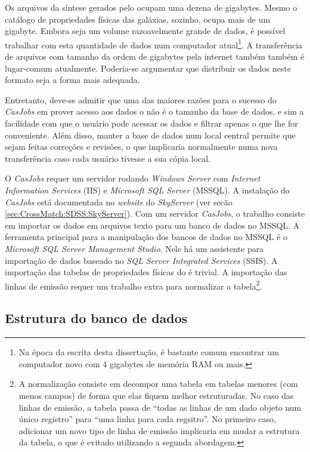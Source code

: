 Os arquivos da síntese gerados pelo \starlight ocupam uma dezena de gigabytes.
Mesmo o catálogo de propriedades físicas das galáxias, sozinho, ocupa mais de um
gigabyte. Embora seja um volume razoavelmente grande de dados, é possível
trabalhar com esta quantidade de dados num computador atual\footnote{Na época da
escrita desta dissertação, é bastante comum encontrar um computador novo com 4
gigabytes de memória RAM ou mais.}. A transferência de arquivos com tamanho da
ordem de gigabytes pela internet também também é lugar-comum atualmente.
Poderia-se argumentar que distribuir os dados neste formato seja a forma mais
adequada.

Entretanto, deve-se admitir que uma das maiores razões para o sucesso do {\em
CasJobs} em prover acesso aos dados o \SDSS não é o tamanho da base de dados, e
sim a facilidade com que o usuário pode acessar os dados e filtrar apenas o que
lhe for conveniente. Além disso, manter a base de dados num local central
permite que sejam feitas correções e revisões, o que implicaria normalmente numa
nova transferência caso cada usuário tivesse a sua cópia local.

O {\em CasJobs} requer um servidor rodando {\em Windows Server} com {\em
Internet Information Services} (IIS) e {\em Microsoft SQL Server} (MSSQL). A
instalação do {\em CasJobs} está documentada no {\em website} do {\em SkyServer}
(ver secão \ref{sec:CrossMatch:SDSS:SkyServer}). Com um servidor {\em CasJobs},
o trabalho consiste em importar os dados em arquivos texto para um banco de
dados no MSSQL. A ferramenta principal para a manipulação dos bancos de dados no
MSSQL é o {\em Microsoft SQL Server Management Studio}. Nele há um assistente
para importação de dados baseado no {\em SQL Server Integrated Services} (SSIS).
A importação das tabelas de propriedades físicas do \starlight é trivial. A
importação das linhas de emissão requer um trabalho extra para normalizar a
tabela\footnote{A normalização consiste em decompor uma tabela em tabelas
menores (com menos campos) de forma que elas fiquem melhor estruturadas. No caso
das linhas de emissão, a tabela passa de ``todas as linhas de um dado objeto num
único registro'' para ``uma linha para cada regsitro''. No primeiro caso,
adicionar um novo tipo de linha de emissão implicaria em mudar a estrutura da
tabela, o que é evitado utilizando a segunda abordagem.}.

\subsection{Estrutura do banco de dados}

